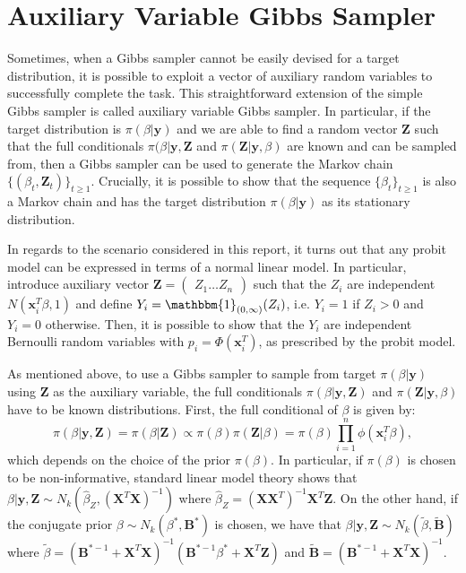 \documentclass{article}
\newcommand{\IF}[2]{\mathbbm{1}_{#1}(#2)} %
\renewcommand{\vec}[1]{\mathbf{#1}}
\begin{document}
\section{Auxiliary Variable Gibbs Sampler}
Sometimes, when a Gibbs sampler cannot be easily devised for a target distribution, it is possible to exploit a vector of auxiliary random variables to successfully complete the task. This straightforward extension of the simple Gibbs sampler is called auxiliary variable Gibbs sampler. In particular, if the target distribution is \(\pi(\beta|\vec{y})\) and we are able to find a random vector \(\vec{Z}\) such that the full conditionals \(\pi(\beta|\vec{y}, \vec{Z}\) and \(\pi(\vec{Z}|\vec{y}, \beta)\) are known and can be sampled from, then a Gibbs sampler can be used to generate the Markov chain \(\{(\beta_t, \vec{Z}_t)\}_{t\geq 1}\). Crucially, it is possible to show that the sequence \(\{\beta_t\}_{t\geq 1}\) is also a Markov chain and has the target distribution \(\pi(\beta|\vec{y})\) as its stationary distribution. 
\par
In regards to the scenario considered in this report, it turns out that any probit model can be expressed in terms of a normal linear model. In particular, introduce auxiliary vector \(\vec{Z} = \begin{pmatrix} Z_1 \hdots Z_n \end{pmatrix}\) such that the \(Z_i\) are independent \(N(\vec{x}_i^T \beta, 1)\) and define \(Y_i = \IF{(0, \infty)}{Z_i}\), i.e. \(Y_i = 1\) if \(Z_i > 0\) and \(Y_i = 0\) otherwise. Then, it is possible to show that the \(Y_i\) are independent Bernoulli random variables with \(p_i = \Phi(\vec{x}_i^T)\), as prescribed by the probit model. 
\par 
As mentioned above, to use a Gibbs sampler to sample from target \(\pi(\beta|\vec{y})\) using \(\vec{Z}\) as the auxiliary variable, the full conditionals \(\pi(\beta|\vec{y}, \vec{Z})\) and \(\pi(\vec{Z}|\vec{y}, \beta)\) have to be known distributions. First, the full conditional of \(\beta\) is given by:
\begin{equation*}
    \pi(\beta|\vec{y}, \vec{Z}) = \pi(\beta|\vec{Z}) \propto \pi(\beta) \pi(\vec{Z}|\beta) = \pi(\beta) \prod_{i=1}^n\phi(\vec{x}_i^T \beta),
\end{equation*}
which depends on the choice of the prior \(\pi(\beta)\). In particular, if \(\pi(\beta)\) is chosen to be non-informative, standard linear model theory shows that \(\beta|\vec{y}, \vec{Z} \sim N_k(\hat{\beta}_Z, (\vec{X}^T\vec{X})^{-1})\) where \(\hat{\beta}_Z = (\vec{X} \vec{X}^T)^{-1}\vec{X}^T \vec{Z}\). On the other hand, if the conjugate prior \(\beta \sim N_k(\beta^*, \vec{B}^*)\) is chosen, we have that \(\beta | \vec{y}, \vec{Z} \sim N_k(\tilde{\beta}, \tilde{\vec{B}})\) where \(\tilde{\beta} = (\vec{B}^{*-1} + \vec{X}^T\vec{X})^{-1}(\vec{B}^{*-1}\beta^* + \vec{X}^T\vec{Z})\) and \(\tilde{\vec{B}} = (\vec{B}^{*-1} + \vec{X}^T\vec{X})^{-1}\). 
\end{document}

